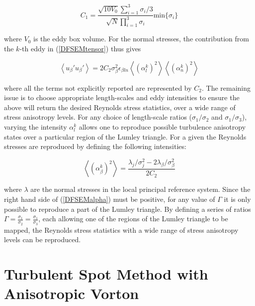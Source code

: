\begin{equation}
	C_1 = \frac{\sqrt{10V_0}\sum_{i=1}^3\sigma_i/3}{\sqrt{N}\prod_{i=1}^3\sigma_i}\mathrm{min}\{\sigma_i\}
\end{equation}

\noindent where $V_0$ is the eddy box volume. For the normal stresses, the contribution from the $k$-th eddy in (\ref{DFSEMtensor}) thus gives

\begin{equation}
	\left<u_{\beta}'u_{\beta}'\right>=2C_2\sigma_{\beta}^2\epsilon_{\beta l n}\left<(\alpha_l^k)^2\right>\left<(\alpha_n^k)^2\right>
\end{equation}


\noindent where all the terms not explicitly reported are represented by $C_2$. The remaining issue is to choose appropriate length-scales and eddy intensities to ensure the above will return the desired Reynolds stress statistics, over a wide range of stress anisotropy levels. For any choice of length-scale ratios ($\sigma_1/\sigma_2$ and $\sigma_1/\sigma_3$), varying the intensity $\alpha_l^k$ allows one to reproduce possible turbulence anisotropy states over a particular region of the Lumley triangle. For a given the Reynolds stresses are reproduced by defining the following intensities:

\begin{equation} \label{DFSEMalpha}
	\left<(\alpha_{\beta}^k)^2\right> = \frac{\lambda_j/\sigma_j^2-2\lambda_{\beta}/\sigma_{\beta}^2}{2C_2}
\end{equation}

\noindent where $\lambda$ are the normal stresses in the local principal reference system. Since the right hand side of (\ref{DFSEMalpha}) must be positive, for any value of $\Gamma$ it is only possible to reproduce a part of the Lumley triangle. By defining a series of ratios $\Gamma = \frac{\sigma_1}{\sigma_2} = \frac{\sigma_1}{\sigma_3}$, each allowing one of the regions of the Lumley triangle to be mapped, the Reynolds stress statistics with a wide range of stress anisotropy levels can be reproduced.


\section{Turbulent Spot Method with Anisotropic Vorton}\label{sectionATSM}

